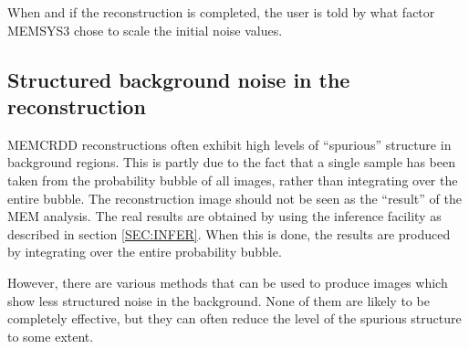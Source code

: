 When and if the reconstruction is completed, the user is told by what factor 
MEMSYS3 chose to scale the initial noise values.

\subsection {Structured background noise in the reconstruction}
\label {SEC:ICFB}

MEMCRDD reconstructions often exhibit high levels of ``spurious'' structure in
background regions. This is partly due to the fact that a single sample has
been taken from the probability bubble of all images, rather than integrating
over the entire bubble. The reconstruction image should not be seen as the
``result'' of the MEM analysis. The real results are obtained by using the
inference facility as described in section \ref {SEC:INFER}. When this is done,
the results are produced by integrating over the entire probability bubble. 

However, there are various methods that can be used to produce images which
show  less structured noise in the background. None of them are likely to be 
completely effective, but they can often reduce the level of the spurious 
structure to some extent.


